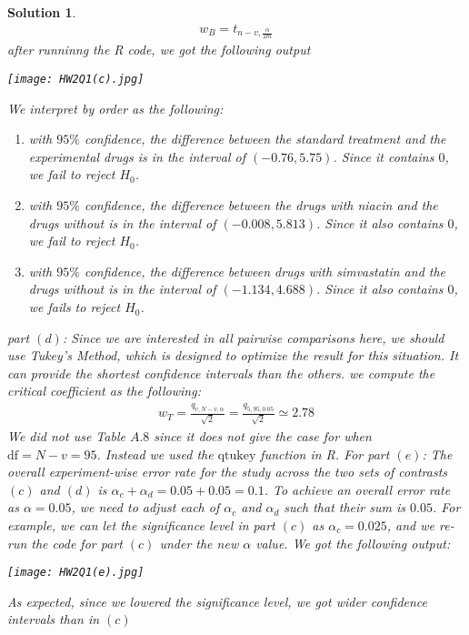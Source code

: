 \documentclass[11pt]{article}
\newtheorem{sol}{Solution}
\begin{document}
\begin{sol}
	\begin{align*}
		w_B = t_{n - v, \frac{\alpha}{2m}}
	\end{align*}
	after runninng the R code, we got the following output
	\begin{center}
		\texttt{[image: HW2Q1(c).jpg]}
	\end{center}
	We interpret by order as the following:
	\begin{enumerate}
		\item [(1)] with $95\%$ confidence, the difference between the standard treatment and the experimental drugs is in the interval of $(-0.76, 5.75)$. Since it contains $0$, we fail to reject $H_0$.
		\item [(2)] with $95\%$ confidence, the difference between the drugs with niacin and the drugs without is in the interval of $(-0.008, 5.813)$.  Since it also contains $0$, we fail to reject $H_0$.
		\item [(3)] with $95\%$ confidence, the difference between drugs with simvastatin and the drugs without is  in the interval of $(-1.134, 4.688)$. Since it also contains $0$, we fails to reject $H_0$.
	\end{enumerate}
	part $(d)$:\vskip 2mm
	Since we are interested in all pairwise comparisons here, we should use Tukey's Method, which is designed to optimize the result for this situation. It can provide the shortest confidence intervals than the others.\vskip 2mm
	we compute the critical coefficient as the following:
	\begin{align*}
		w_T = \frac{q_{v, N - v, \alpha}}{\sqrt{2}} = \frac{q_{5, 95, 0.05}}{\sqrt{2}} \simeq 2.78
	\end{align*}
	We did not use Table $A.8$ since it does not give the case for when $\text{df} = N - v = 95$. Instead we used the $\text{qtukey}$ function in R.\vskip 2mm
	For part $(e)$:\vskip 2mm
	The overall experiment-wise error rate for the study across the two sets of contrasts $(c)$ and $(d)$ is $\alpha_c + \alpha_d = 0.05 + 0.05 = 0.1$.\vskip 2mm
	To achieve an overall error rate as $\alpha = 0.05$, we need to adjust each of $\alpha_c$ and $\alpha_d$ such that their sum is $0.05$. For example, we can let the significance level in part $(c)$ as $\alpha_c  = 0.025$, and we re-run the code for part $(c)$ under the new $\alpha$ value. We got the following output:
	\begin{center}
		\texttt{[image: HW2Q1(e).jpg]}
	\end{center}
	As expected, since we lowered the significance level, we got wider confidence intervals than in $(c)$
\end{sol}
\end{document}
